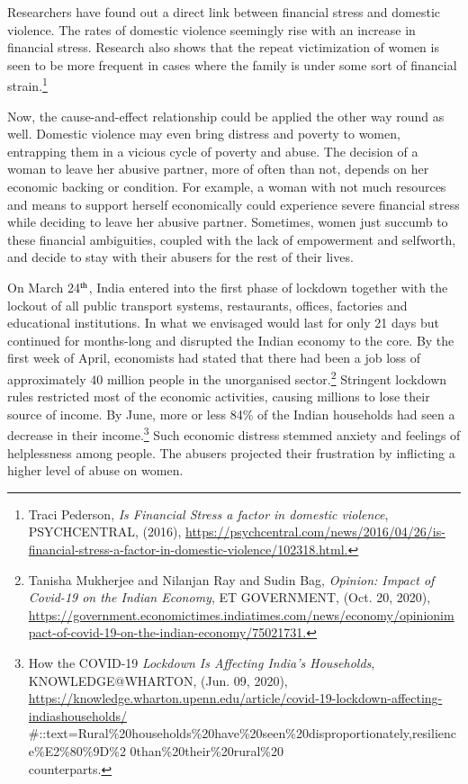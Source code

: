 \begin{multicols}{2}

\noi
Researchers have found out a direct link between financial stress and domestic violence. The
rates of domestic violence seemingly rise with an increase in financial stress. Research also
shows that the repeat victimization of women is seen to be more frequent in cases where the
family is under some sort of financial strain.\footnote{Traci Pederson, \textit{Is Financial Stress a factor in domestic violence}, PSYCHCENTRAL, (2016),
\url{https://psychcentral.com/news/2016/04/26/is-financial-stress-a-factor-in-domestic-violence/102318.html.}}

\noi
Now, the cause-and-effect relationship could be applied the other way round as well.
Domestic violence may even bring distress and poverty to women, entrapping them in a
vicious cycle of poverty and abuse. The decision of a woman to leave her abusive partner,
more of often than not, depends on her economic backing or condition. For example, a
woman with not much resources and means to support herself economically could experience
severe financial stress while deciding to leave her abusive partner. Sometimes, women just
succumb to these financial ambiguities, coupled with the lack of empowerment and selfworth, and decide to stay with their abusers for the rest of their lives.

\noi
On March 24$^{\rm th}$, India entered into the first phase of lockdown together with the lockout of all
public transport systems, restaurants, offices, factories and educational institutions. In what
we envisaged would last for only 21 days but continued for months-long and disrupted the
Indian economy to the core. By the first week of April, economists had stated that there had
been a job loss of approximately 40 million people in the unorganised sector.\footnote{Tanisha Mukherjee and Nilanjan Ray and Sudin Bag, \textit{Opinion: Impact of Covid-19 on the Indian Economy},
ET GOVERNMENT, (Oct. 20, 2020), \url{https://government.economictimes.indiatimes.com/news/economy/opinionimpact-of-covid-19-on-the-indian-economy/75021731.}}
 Stringent
lockdown rules restricted most of the economic activities, causing millions to lose their
source of income. By June, more or less 84\% of the Indian households had seen a decrease in their income.\footnote{How the COVID-19 \textit{Lockdown Is Affecting India’s Households}, KNOWLEDGE@WHARTON, (Jun. 09, 2020),\\
\url{https://knowledge.wharton.upenn.edu/article/covid-19-lockdown-affecting-indiashouseholds/}\\\#::text=Rural\%20households\%20have\%20seen\%20disproportionately,resilience\%E2\%80\%9D\%2
0than\%20their\%20rural\%20\\ counterparts.} Such economic distress stemmed anxiety and feelings of helplessness among
people. The abusers projected their frustration by inflicting a higher level of abuse on women. 
 

\end{multicols}
